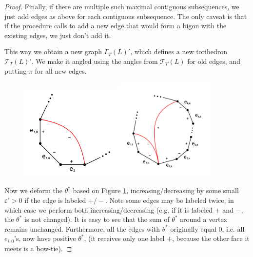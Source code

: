 \documentclass[11pt]{amsart}
\newcommand{\figref}[1]{Figure \ref{#1}}
\newcommand{\sT}{{\mathcal{T}}}
\newcommand{\veps}{\varepsilon}
\theoremstyle{plain}
\theoremstyle{definition}
\begin{document}
\begin{proof}
Finally, if there are multiple such maximal contiguous subsequences,
we just add edges as above for each contiguous subsequence.
The only caveat is that if the procedure calls to add a new edge
that would form a bigon with the existing edges,
we just don't add it.


This way we obtain a new graph $\Gamma_T(L)'$, which defines a
new torihedron $\sT_T(L)'$.
We make it angled using the angles from $\sT_T(L)$ for old edges,
and putting $\pi$ for all new edges.


\begin{figure}
\label{f:adding_edges}
\includegraphics[width=5cm]{more_pictures/one_edge.png}
\includegraphics[width=5cm]{more_pictures/two_edge_many.png}
\end{figure}

Now we deform the $\theta^*$ based on \figref{f:adding_edges},
increasing/decreasing by some small $\veps' > 0$ if the edge
is labeled $+/-$.
Note some edges may be labeled twice, in which case we perform
both increasing/decreasing (e.g. if it is labeled $+$ and $-$,
the $\theta^*$ is not changed).
It is easy to see that the sum of $\theta^*$ around a vertex
remains unchanged.
Furthermore, all the edges with $\theta^*$ originally equal 0,
i.e. all $e_{i,0}$'s,
now have positive $\theta^*$,
(it receives only one label $+$,
because the other face it meets is a bow-tie).



\end{proof}
\end{document}
